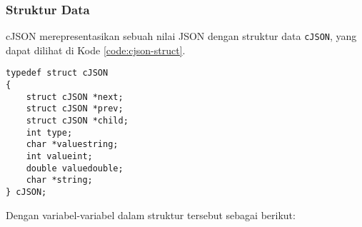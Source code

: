 \subsubsection{Struktur Data}
\label{sec:cmodules-cJSON-datastruct}

cJSON merepresentasikan sebuah nilai JSON dengan struktur data \verb|cJSON|, yang dapat dilihat di Kode \ref{code:cjson-struct}.

\begin{lstlisting}[caption=Struktur data cJSON, label=code:cjson-struct]
typedef struct cJSON
{
    struct cJSON *next;
    struct cJSON *prev;
    struct cJSON *child;
    int type;
    char *valuestring;
    int valueint;
    double valuedouble;
    char *string;
} cJSON;
\end{lstlisting}
\noindent
Dengan variabel-variabel dalam struktur tersebut sebagai berikut:

